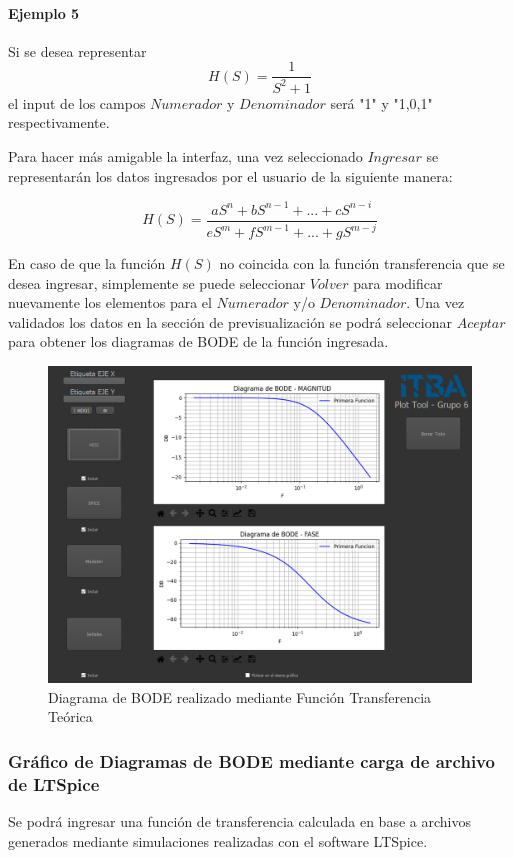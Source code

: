 \paragraph{Ejemplo 5}

Si se desea representar $$H(S) = \frac{1}{S^2 + 1} $$el input de los campos $Numerador$ y $Denominador$ será "1" y "1,0,1" respectivamente.

Para hacer más amigable la interfaz, una vez seleccionado $Ingresar$ se representarán los datos ingresados por el usuario de la siguiente manera:

$$H(S) = \frac{aS^n + bS^{n-1}+ ... +cS^{n-i}}{eS^m + fS^{m-1}+ ... +gS^{m-j}} $$

En caso de que la función $H(S)$ no coincida con la función transferencia que se desea ingresar, simplemente se puede seleccionar $Volver$ para modificar nuevamente los elementos para el $Numerador$ y/o $Denominador$. 
Una vez validados los datos en la sección de previsualización se podrá seleccionar $Aceptar$ para obtener los diagramas de BODE de la función ingresada.

\begin{figure}[!htb] 
    \centering 
    \includegraphics [width=0.8
    \textwidth] {../EJ2/LatexScreenshots/plotToolTeorica.png} 
    \caption{Diagrama de BODE realizado mediante Función Transferencia Teórica}
    \label{fig:transferFunctionPlotTool}
\end{figure}

\subsubsection{Gráfico de Diagramas de BODE mediante carga de archivo de LTSpice}

Se podrá ingresar una función de transferencia calculada en base a archivos generados mediante simulaciones realizadas con el software LTSpice.

